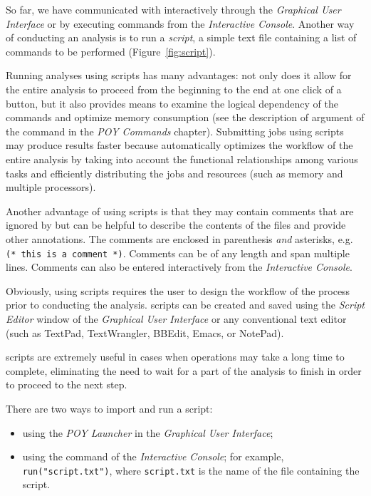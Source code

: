 {So far, we have communicated with \poy interactively through the \emph{Graphical User Interface} or by executing 
commands from the \emph{Interactive Console}. Another way of conducting an analysis is to run a \emph{script}, a 
simple text file containing a list of commands to be performed (Figure~\ref{fig:script}). 

Running analyses using scripts has many advantages: not only does it allow for the entire analysis to proceed from 
the beginning to the end at one click of a button, but it also provides means to examine the logical dependency of the 
commands and optimize memory consumption (see the description of  argument of the 
command  in the \emph{POY Commands} chapter). Submitting jobs using scripts may produce 
results faster because \poy automatically optimizes the workflow of the entire analysis by taking into account the
functional relationships among various tasks and efficiently distributing the jobs and resources (such as memory 
and multiple processors).

Another advantage of using scripts is that they may contain comments that are ignored by \poy but can be helpful 
to describe the contents of the files and provide other annotations. The comments are enclosed in parenthesis 
\emph{and} asterisks, e.g. \texttt{(* this is a comment *)}. Comments can be of any length and span multiple 
lines. Comments can also be entered interactively from the \emph{Interactive Console}.

Obviously, using scripts requires the user to design the workflow of the process prior to conducting the analysis. 
\poy scripts can be created and saved using the \emph{Script Editor} window of the \poy \emph{Graphical User Interface} 
or any conventional text editor (such as TextPad, TextWrangler, BBEdit, Emacs, or NotePad).

\poy scripts are extremely useful in cases when operations may take a long time to complete, eliminating the need to wait 
for a part of the analysis to finish in order to proceed to the next step.

There are two ways to import and run a script:
\begin{itemize}
\item using the \emph{POY Launcher} in the \emph{Graphical User Interface};
\item using the command  of the \emph{Interactive Console}; for example, \texttt{run("script.txt")}, 
where \texttt{script.txt} is the name of the file containing the script.
\end{itemize}

}
